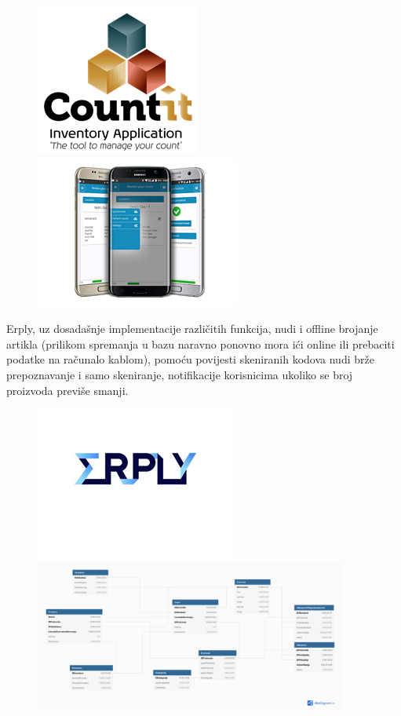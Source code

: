 		\begin{figure}[H]
			\includegraphics[height=5cm]{slike/CT_logo.png}
			\includegraphics[height=5cm]{slike/CT_slika.png}
			\centering
			\label{ct_logo}
		\end{figure}
		
		
		Erply, uz dosadašnje implementacije različitih funkcija, nudi i offline brojanje artikla (prilikom spremanja u bazu naravno ponovno mora ići online ili prebaciti podatke na računalo kablom), pomoću povijesti skeniranih kodova nudi brže prepoznavanje i samo skeniranje, notifikacije korisnicima ukoliko se broj proizvoda previše smanji.
		
		\begin{figure}[H]
			\includegraphics[height=5cm]{slike/ER_logo.png}
			\includegraphics[height=5cm]{slike/ER_slika.png}
			\centering
			\label{er_logo}
		\end{figure}
		
